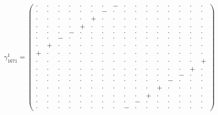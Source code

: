 \documentclass[
  10pt,
]{article}
\begin{document}
\[\gamma_{1671}^1=\left(\begin{smallmatrix} \cdot & \cdot & \cdot & \cdot & \cdot & \cdot & \cdot & - & \cdot & \cdot & \cdot & \cdot & \cdot & \cdot & \cdot & \cdot \\ \cdot & \cdot & \cdot & \cdot & \cdot & \cdot & - & \cdot & \cdot & \cdot & \cdot & \cdot & \cdot & \cdot & \cdot & \cdot \\ \cdot & \cdot & \cdot & \cdot & \cdot & + & \cdot & \cdot & \cdot & \cdot & \cdot & \cdot & \cdot & \cdot & \cdot & \cdot \\ \cdot & \cdot & \cdot & \cdot & + & \cdot & \cdot & \cdot & \cdot & \cdot & \cdot & \cdot & \cdot & \cdot & \cdot & \cdot \\ \cdot & \cdot & \cdot & - & \cdot & \cdot & \cdot & \cdot & \cdot & \cdot & \cdot & \cdot & \cdot & \cdot & \cdot & \cdot \\ \cdot & \cdot & - & \cdot & \cdot & \cdot & \cdot & \cdot & \cdot & \cdot & \cdot & \cdot & \cdot & \cdot & \cdot & \cdot \\ \cdot & + & \cdot & \cdot & \cdot & \cdot & \cdot & \cdot & \cdot & \cdot & \cdot & \cdot & \cdot & \cdot & \cdot & \cdot \\ + & \cdot & \cdot & \cdot & \cdot & \cdot & \cdot & \cdot & \cdot & \cdot & \cdot & \cdot & \cdot & \cdot & \cdot & \cdot \\ \cdot & \cdot & \cdot & \cdot & \cdot & \cdot & \cdot & \cdot & \cdot & \cdot & \cdot & \cdot & \cdot & \cdot & \cdot & + \\ \cdot & \cdot & \cdot & \cdot & \cdot & \cdot & \cdot & \cdot & \cdot & \cdot & \cdot & \cdot & \cdot & \cdot & + & \cdot \\ \cdot & \cdot & \cdot & \cdot & \cdot & \cdot & \cdot & \cdot & \cdot & \cdot & \cdot & \cdot & \cdot & - & \cdot & \cdot \\ \cdot & \cdot & \cdot & \cdot & \cdot & \cdot & \cdot & \cdot & \cdot & \cdot & \cdot & \cdot & - & \cdot & \cdot & \cdot \\ \cdot & \cdot & \cdot & \cdot & \cdot & \cdot & \cdot & \cdot & \cdot & \cdot & \cdot & + & \cdot & \cdot & \cdot & \cdot \\ \cdot & \cdot & \cdot & \cdot & \cdot & \cdot & \cdot & \cdot & \cdot & \cdot & + & \cdot & \cdot & \cdot & \cdot & \cdot \\ \cdot & \cdot & \cdot & \cdot & \cdot & \cdot & \cdot & \cdot & \cdot & - & \cdot & \cdot & \cdot & \cdot & \cdot & \cdot \\ \cdot & \cdot & \cdot & \cdot & \cdot & \cdot & \cdot & \cdot & - & \cdot & \cdot & \cdot & \cdot & \cdot & \cdot & \cdot \end{smallmatrix}\right)\]
\end{document}
